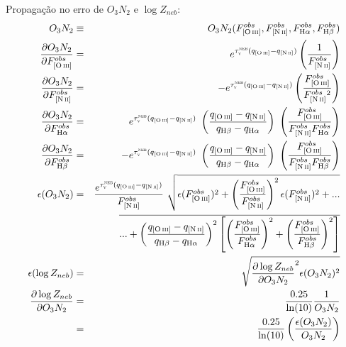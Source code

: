 \documentclass[a4paper,12pt]{article}
\newcommand{\tauVN}{\tau_{\mathrm{\textsc{v}}}^{\mathrm{\textsc{neb}}}}
\newcommand{\Halpha}{\ifmmode \mathrm{H}\alpha \else H$\alpha$\xspace \fi}
\newcommand{\Hbeta}{\ifmmode \mathrm{H}\beta \else H$\beta$\xspace \fi}
\newcommand{\nII}{\ifmmode [\mathrm{N\,\textsc{ii}}] \else [N\thinspace\textsc{ii}]\xspace \fi}
\newcommand{\oIII}{\ifmmode [\mathrm{O\,\textsc{iii}}] \else [O\thinspace{\sc iii}]\xspace \fi}
\newcommand{\del}[2]{\frac{\partial #1}{\partial #2}}
\begin{document}
Propagação no erro de $O_3N_2$ e $\log Z_{neb}$:
\begin{eqnarray}
	O_3N_2 &\equiv& O_3N_2(F_{\oIII}^{obs}, F_{\nII}^{obs}, F_{\Halpha}^{obs}, F_{\Hbeta}^{obs}) \\
	\del{O_3N_2}{F_{\oIII}^{obs}} &=& e^{\tauVN (q_{\oIII} - q_{\nII})}\left(\frac{1}{F_{\nII}^{obs}}\right) \\
	\del{O_3N_2}{F_{\nII}^{obs}} &=& - e^{\tauVN (q_{\oIII} - q_{\nII})}\left(\frac{F_{\oIII}^{obs}}{F_{\nII}^{obs}{}^2}\right) \\
	\del{O_3N_2}{F_{\Halpha}^{obs}} &=& e^{\tauVN (q_{\oIII} - q_{\nII})} \
\left(\frac{q_{\oIII} - q_{\nII}}{q_{\Hbeta} - q_{\Halpha}}\right) \
\left(\frac{F_{\oIII}^{obs}}{F_{\nII}^{obs} F_{\Halpha}^{obs}}\right) \\
	\del{O_3N_2}{F_{\Hbeta}^{obs}} &=& - e^{\tauVN (q_{\oIII} - q_{\nII})} \
\left(\frac{q_{\oIII} - q_{\nII}}{q_{\Hbeta} - q_{\Halpha}}\right) \
\left(\frac{F_{\oIII}^{obs}}{F_{\nII}^{obs} F_{\Hbeta}^{obs}}\right) \\
	\nonumber \epsilon(O_3N_2) &=& \frac{e^{\tauVN (q_{\oIII} - q_{\nII})}}{F_{\nII}^{obs}} \
\sqrt{ \epsilon(F_{\oIII}^{obs})^2 + \left(\frac{F_{\oIII}^{obs}}{F_{\nII}^{obs}}\right)^2 \epsilon(F_{\nII}^{obs})^2 + ... } \\
	&& \overline{... + \left(\frac{q_{\oIII} - q_{\nII}}{q_{\Hbeta} - q_{\Halpha}}\right)^2 \left[\left(\frac{F_{\oIII}^{obs}}{F_{\Halpha}^{obs}}\right)^2 + \left(\frac{F_{\oIII}^{obs}}{F_{\Hbeta}^{obs}}\right)^2 \right]} \\
	\epsilon(\log Z_{neb}) &=& \sqrt{\del{\log Z_{neb}}{O_3N_2}^2 \epsilon(O_3N_2)^2} \\
	\del{\log Z_{neb}}{O_3N_2} &=& \frac{0.25}{\ln(10)} \frac{1}{O_3N_2} \\
	&=& \frac{0.25}{\ln(10)} \left(\frac{\epsilon(O_3N_2)}{O_3N_2}\right)
\end{eqnarray}
\end{document}
